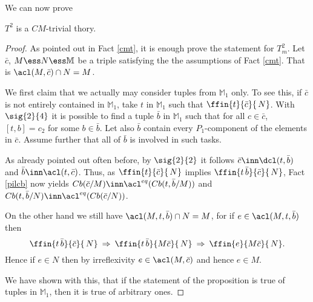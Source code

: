 We can now prove 
\begin{prop}
$T^{2}$ is a $CM$-trivial thory.
\end{prop}
\begin{proof}
As pointed out in Fact \ref{cmt}, it is enough prove the statement for $T^{2}_{m}$.
Let $\bar c$, $M\ess N\ess\mathbb{M}$ be a triple satisfying the the assumptions of Fact \ref{cmt}. That is
$\acl(M,\bar c)\cap N=M$.
 
We first claim that we actually may consider tuples from $\mathbb{M}_{1}$ only. To see this, if $\bar c$ is not
entirely contained in $\mathbb{M}_{1}$, take
$t$ in $\mathbb{M}_{1}$ such that $\ffin{t}{\bar c}{\,N}$.
With $\sig{2}{4}$ it is possible to find a tuple $\bar b$ in $\mathbb{M}_{1}$ such that
for all $c\in\bar c$, $[t,b]=c_{2}$ for some $b\in\bar b$. Let also $\bar b$ contain every $P_{1}$-component
of the elements in $\bar c$. Assume further that all of $\bar b$ is involved in such tasks.

As already pointed out often before, by $\sig{2}{2}$ it follows $\bar c\inn\dcl(t,%
\bar b)$ and $%
\bar b\inn\acl(t,\bar c)$.
Thus, as $\ffin{t}{\bar c}{\,N}$ implies $\ffin{t\,%
\bar b}{\bar c}{\,N}$, Fact \ref{pilcb} now yields $Cb(\bar c/M)\inn\acl^{eq}(Cb(t,%
\bar b/M))$ and $Cb(t,%
\bar b/N)\inn\acl^{eq}(Cb(\bar c/N))$.
 
On the other hand we still have $\acl(M,t,%
\bar b)\cap N=M$, for if $e\in\acl(M,t,%
\bar b)$ then
$$\ffin{t\,%
\bar b}{\bar c}{\,N}\:\Rightarrow\:\ffin{t\,%
\bar b}{M\bar c}{\,N}\:\Rightarrow\:\ffin{e}{M\bar c}{\,N}.$$
Hence if $e\in N$ then by irreflexivity $e\in\acl(M,\bar c)$ and hence $e\in M$. 

We have shown with this, that if the statement of the proposition is true of tuples in $\mathbb{M}_{1}$, then it is true of
arbitrary ones.
 




\end{proof}
